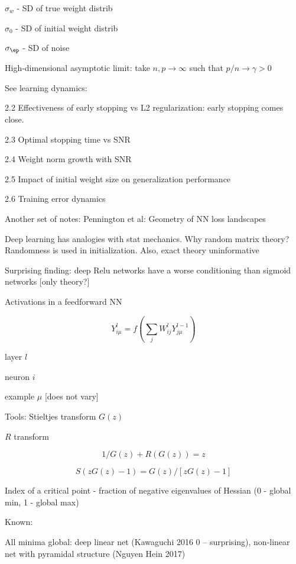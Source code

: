 \documentclass[english]{article}
\begin{document}
$\sigma_w$ - SD of true weight distrib

$\sigma_0$ - SD of initial weight distrib

$\sigma_\ep$ - SD of noise

\item 
High-dimensional asymptotic limit: take $n,p \to \infty$ such that $p/n\to \gamma>0$

See learning dynamics: 

2.2 Effectiveness of early stopping vs L2 regularization: early stopping comes close.

2.3 Optimal stopping time vs SNR

2.4 Weight norm growth with SNR

2.5 Impact of initial weight size on generalization performance

2.6 Training error dynamics
\eenum

Another set of notes: Pennington et al: Geometry of NN loss landscapes


\benum

\item Deep learning has analogies with stat mechanics. Why random matrix theory? Randomness is used in initialization. Also, exact theory uninformative


Surprising finding: deep Relu networks have a worse conditioning than sigmoid networks [only theory?]

\item Activations in a feedforward NN

$$Y_{i\mu}^l = f(\sum_j W_{ij}^l Y_{j\mu}^{l-1})$$

\benum
\item layer $l$

\item neuron $i$

\item example $\mu$ [does not vary]
\eenum
\item Tools: 
Stieltjes transform $G(z)$

$R$ transform

$$1/G(z) + R(G(z)) = z$$

$$S(zG(z)-1) = G(z)/[zG(z)-1]$$


\item Index of a critical point - fraction of negative eigenvalues of Hessian (0 - global min, 1 - global max)

Known:

All minima global: deep linear net (Kawaguchi 2016 0 -- surprising), non-linear net with pyramidal structure (Nguyen Hein 2017)
\end{document}
